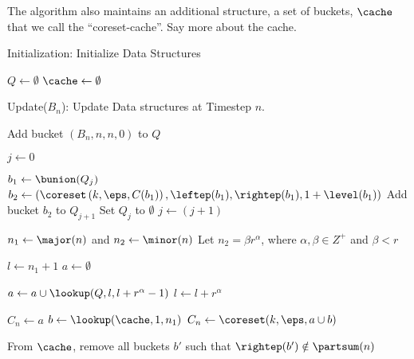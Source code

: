 {The algorithm also maintains an additional structure, a set of buckets, $\cache$ that we call the ``coreset-cache''.  {\color{red} Say more about the cache.}


\begin{algorithm}
\label{algo:fkm-init}
\DontPrintSemicolon
\caption{Initialization: Initialize Data Structures}
$Q \gets \emptyset$\;
$\cache \gets \emptyset$\;
\end{algorithm}

\begin{algorithm}
\label{algo:fkm-process}
\DontPrintSemicolon
\caption{Update($B_n$): Update Data structures at Timestep $n$.}

Add bucket $(B_n, n, n, 0)$ to $Q$\;

$j \leftarrow 0$\;

{
  $b_1 \gets \bunion(Q_j)$ \;
  $b_2 \gets (\coreset\left(k, \eps, C(b_1) \right), \leftep(b_1), \rightep(b_1), 1+ \level(b_1))$\;
  Add bucket $b_2$ to $Q_{j+1}$ \;
  Set $Q_j$ to $\emptyset$\; 
  $j \gets (j+1)$ \;
}


$n_1 \gets \major(n)$ and $n_2 \gets \minor(n)$\;
Let $n_2=\beta r^{\alpha}$, where $\alpha, \beta\in Z^+$ and $\beta<r$ \;

$l \gets n_1+1$ \;
$a \gets \emptyset$ \;

{
	$a \gets a \cup \lookup(Q, l, l+r^{\alpha}-1)$ \;
	$l \gets l+r^{\alpha}$\;
} 


{
	$C_n \gets a$\;
}
{
	$b \gets \lookup(\cache, 1, n_1)$ \;
	$C_n \gets \coreset(k, \eps, a \cup b)$\;
}

{
From $\cache$, remove all buckets $b'$  such that $\rightep(b') \notin \partsum(n)$\;

}
\end{algorithm}}
